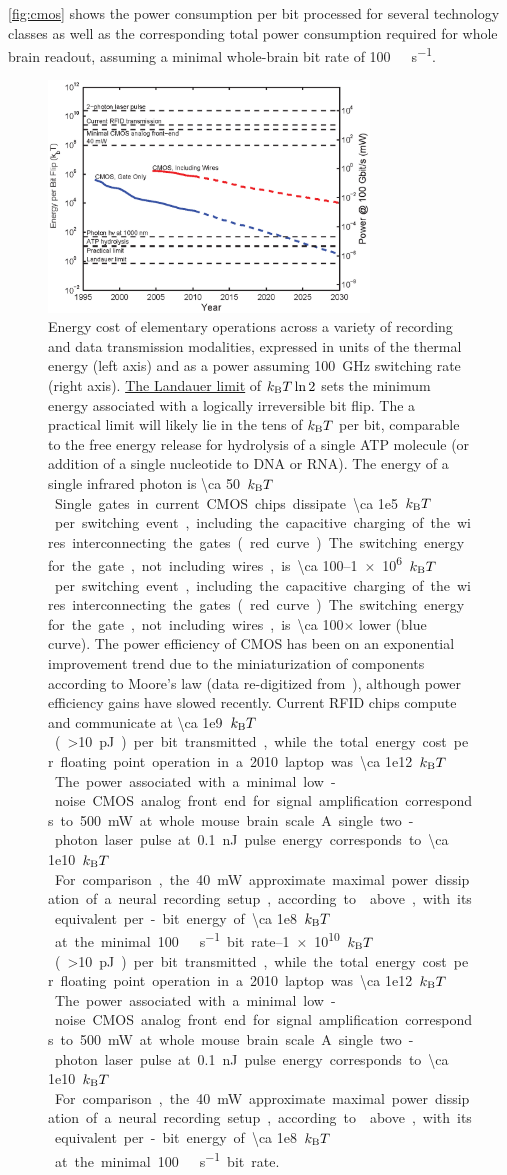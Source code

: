 \autoref{fig:cmos} shows the power consumption per bit processed for several technology classes as well as the corresponding total power consumption required for whole brain readout, assuming a minimal whole-brain bit rate of \SI{100}{\giga\bit\per\second}.

\begin{figure}[htbp]
\caption{
Energy cost of elementary operations across a variety of recording and data transmission modalities, expressed in units of the thermal energy (left axis) and as a power assuming \SI{100}{\giga\hertz} switching rate (right axis). \hyperref[eq:landauer]{The Landauer limit} of $k_{\text{\scriptsize B}} T \ln 2$ sets the minimum energy associated with a logically irreversible bit flip. The a practical limit will likely lie in the tens of $k_{\text{\scriptsize B}} T$ per bit, comparable to the free energy release for hydrolysis of a single ATP molecule (or addition of a single nucleotide to DNA or RNA). The energy of a single infrared photon is \SI{\ca 50}{$k_{\text{\scriptsize B}} T$}. Single gates in current CMOS chips dissipate \SIrange{\ca 1e5}{1e6}{$k_{\text{\scriptsize B}} T$} per switching event, including the capacitive charging of the wires interconnecting the gates (red curve). The switching energy for the gate, not including wires, is \num{\ca 100}$\times$ lower (blue curve). The power efficiency of CMOS has been on an exponential improvement trend due to the miniaturization of components according to Moore's law (data re-digitized from~\cite{tucker11}), although power efficiency gains have slowed recently. Current RFID chips compute and communicate at \SIrange{\ca 1e9}{1e10}{$k_{\text{\scriptsize B}} T$} (\SI{>10}{\pico\joule}) per bit transmitted, while the total energy cost per floating point operation in a 2010 laptop was \SI{\ca 1e12}{$k_{\text{\scriptsize B}} T$}. The power associated with a minimal low-noise CMOS analog front end for signal amplification corresponds to \SI{500}{\milli\watt} at whole mouse brain scale. A single two-photon laser pulse at \SI{0.1}{\nano\joule} pulse energy corresponds to \SI{\ca 1e10}{$k_{\text{\scriptsize B}} T$}. For comparison, the \SI{40}{\milli\watt} approximate maximal power dissipation of a neural recording setup, according to  above, with its equivalent per-bit energy of \SI{\ca 1e8}{$k_{\text{\scriptsize B}} T$} at the minimal \SI{100}{\giga\bit\per\second} bit rate.
}
\label{fig:cmos}
\centering
\includegraphics[width=0.76\textwidth]{figs/Fig4.eps}
\end{figure}

